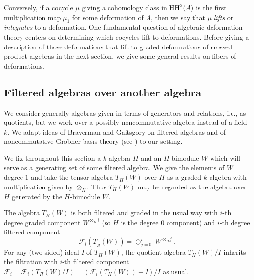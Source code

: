\documentclass[11pt]{amsart}
\numberwithin{equation}{section}
\newcommand{\sA}{A }
\renewcommand{\_}[1]{\mbox{$_{\left( #1 \right)}$}}
\newcommand{\F}{\mathcal F}
\newcommand{\ot}{\otimes}
\newcommand{\Ho}{H}%
\newcommand{\HH}{{\rm HH}}
\begin{document}
  Conversely, if a cocycle $\mu$ giving a cohomology class in $\HH^2(\sA)$
  is the first multiplication map $\mu_1$ for some deformation of $\sA$,
  then we say that $\mu$ {\em lifts} or {\em integrates}
  to a deformation.  One fundamental question of algebraic deformation
  theory
  centers on determining which cocycles lift to deformations.
Before giving a description of those deformations that lift to graded deformations
of crossed product algebras in the next section, 
we give some general results on fibers of deformations.

\subsection*{Filtered algebras over another algebra}

We consider generally algebras given in terms
of generators and relations, i.e., as quotients, but we work over a
possibly noncommutative
algebra instead of a field $k$.
We adapt ideas of
Braverman and Gaitsgory \cite{Braverman-Gaitsgory} on filtered
algebras
and of noncommutative Gr\"obner basis theory (see \cite{Li2011})
to our setting.

We fix throughout this section a $k$-algebra $H$ and an 
$H$-bimodule $W$ which will serve as a generating set of some filtered
algebra. We give the elements of $W$ degree $1$ and take
the tensor algebra $T_H(W)$ over $\Ho$ as a graded
$k$-algebra with multiplication given by $\ot_H$.
Thus $T_H(W)$ may be regarded as the algebra over $H$
generated by the $H$-bimodule $W$.

The algebra $T_H(W)$ is both filtered and graded
in the usual way with
$i$-th degree graded component $W^{\ot_{\!\Ho} i}$
(so $H$ is the degree $0$ component)
and $i$-th degree filtered component
$$\mathcal{F}_i(T_{\! _H}(W))=\oplus_{j=0}^i \ W^{\ot_{\!\Ho} j}\, .$$
%
For any (two-sided) ideal $I$ of $T_H(W)$, the quotient
algebra
$T_H(W)/I$ inherits the filtration with
$i$-th filtered component $\F_i= 
\F_i(T_H(W)/I)= (\F_i(T_H(W)) + I )/I$ as usual.
\end{document}
